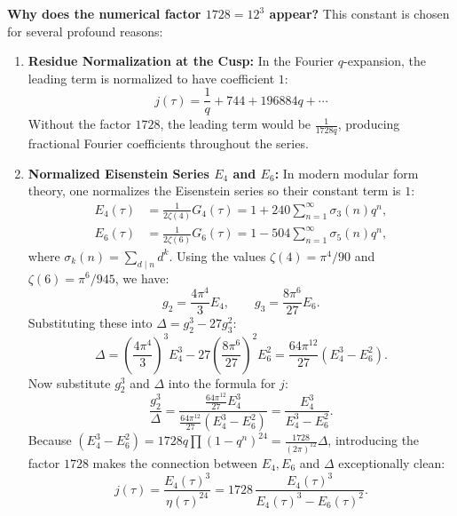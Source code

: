 \documentclass[a4paper]{article}
\begin{document}
\noindent\textbf{Why does the numerical factor $1728 = 12^3$ appear?}
This constant is chosen for several profound reasons:
\begin{enumerate}[leftmargin=2em]
 \item \textbf{Residue Normalization at the Cusp:}
 In the Fourier $q$-expansion, the leading term is normalized to have coefficient $1$:
 \begin{equation}
  j(\tau) = \frac{1}{q} + 744 + 196884 q + \cdots
 \end{equation}
 Without the factor $1728$, the leading term would be $\frac{1}{1728 q}$, producing fractional Fourier coefficients throughout the series.
 
 \item \textbf{Normalized Eisenstein Series $E_4$ and $E_6$:}
 In modern modular form theory, one normalizes the Eisenstein series so their constant term is $1$:
 \begin{align}
  E_4(\tau) &= \frac{1}{2\zeta(4)} G_4(\tau) = 1 + 240 \sum_{n=1}^\infty \sigma_3(n) q^n, \\
  E_6(\tau) &= \frac{1}{2\zeta(6)} G_6(\tau) = 1 - 504 \sum_{n=1}^\infty \sigma_5(n) q^n,
 \end{align}
 where $\sigma_k(n) = \sum_{d \mid n} d^k$. Using the values $\zeta(4) = \pi^4/90$ and $\zeta(6) = \pi^6/945$, we have:
 \begin{equation}
  g_2 = \frac{4\pi^4}{3} E_4, \qquad g_3 = \frac{8\pi^6}{27} E_6.
 \end{equation}
 Substituting these into $\Delta = g_2^3 - 27g_3^2$:
 \begin{equation}
  \Delta = \left(\frac{4\pi^4}{3}\right)^3 E_4^3 - 27 \left(\frac{8\pi^6}{27}\right)^2 E_6^2 = \frac{64\pi^{12}}{27} (E_4^3 - E_6^2).
 \end{equation}
 Now substitute $g_2^3$ and $\Delta$ into the formula for $j$:
 \begin{equation}
  \frac{g_2^3}{\Delta} = \frac{\frac{64\pi^{12}}{27} E_4^3}{\frac{64\pi^{12}}{27} (E_4^3 - E_6^2)} = \frac{E_4^3}{E_4^3 - E_6^2}.
 \end{equation}
 Because $(E_4^3 - E_6^2) = 1728 q \prod (1-q^n)^{24} = \frac{1728}{(2\pi)^{12}} \Delta$, introducing the factor $1728$ makes the connection between $E_4, E_6$ and $\Delta$ exceptionally clean:
 \begin{equation}
  \boxed{j(\tau) = \frac{E_4(\tau)^3}{\eta(\tau)^{24}} = 1728 \, \frac{E_4(\tau)^3}{E_4(\tau)^3 - E_6(\tau)^2}}.
  \label{eq:j_E4_E6}
 \end{equation}
 

\end{enumerate}
\end{document}

